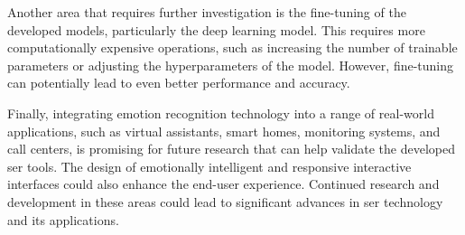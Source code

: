 Another area that requires further investigation is the fine-tuning of the developed models, particularly the deep learning model. This requires more computationally expensive operations, such as increasing the number of trainable parameters or adjusting the hyperparameters of the model. However, fine-tuning can potentially lead to even better performance and accuracy.

Finally, integrating emotion recognition technology into a range of real-world applications, such as virtual assistants, smart homes, monitoring systems, and call centers, is promising for future research that can help validate the developed \ac{ser} tools. The design of emotionally intelligent and responsive interactive interfaces could also enhance the end-user experience. Continued research and development in these areas could lead to significant advances in \ac{ser} technology and its applications.